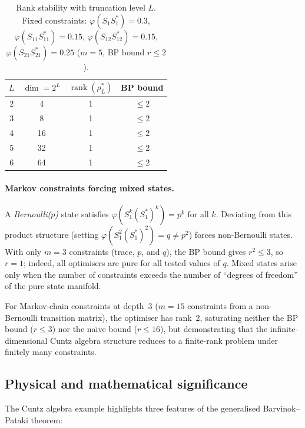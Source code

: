 \documentclass[11pt,a4paper]{article}
\theoremstyle{definition}
\newcommand{\rank}{\operatorname{rank}}
\begin{document}
\begin{table}[htbp]
\centering
\caption{Rank stability with truncation level $L$.  Fixed constraints:
$\varphi(S_1 S_1^*) = 0.3$, $\varphi(S_{11} S_{11}^*) = 0.15$,
$\varphi(S_{12} S_{12}^*) = 0.15$, $\varphi(S_{21} S_{21}^*) = 0.25$
($m = 5$, BP bound $r \leq 2$).}
\label{tab:cuntz-conv}
\begin{tabular}{cccc}
\toprule
$L$ & $\dim = 2^L$ & $\rank(\rho^*_L)$ & BP bound \\
\midrule
2 &  4 & 1 & $\leq 2$ \\
3 &  8 & 1 & $\leq 2$ \\
4 & 16 & 1 & $\leq 2$ \\
5 & 32 & 1 & $\leq 2$ \\
6 & 64 & 1 & $\leq 2$ \\
\bottomrule
\end{tabular}
\end{table}

\paragraph{Markov constraints forcing mixed states.}

A \emph{Bernoulli($p$)} state satisfies
$\varphi(S_1^k (S_1^*)^k) = p^k$ for all $k$.  Deviating from
this product structure (setting
$\varphi(S_1^2(S_1^*)^2) = q \neq p^2$) forces non-Bernoulli
states.  With only $m = 3$ constraints (trace, $p$, and $q$),
the BP bound gives $r^2 \leq 3$, so $r = 1$; indeed, all
optimisers are pure for all tested values of $q$.  Mixed states
arise only when the number of constraints exceeds the number of
``degrees of freedom'' of the pure state manifold.

For Markov-chain constraints at depth~3 ($m = 15$ constraints
from a non-Bernoulli transition matrix), the optimiser has
rank~2, saturating neither the BP bound ($r \leq 3$) nor the
na\"{\i}ve bound ($r \leq 16$), but demonstrating that the
infinite-dimensional Cuntz algebra structure reduces to a
finite-rank problem under finitely many constraints.

\subsection{Physical and mathematical significance}

The Cuntz algebra example highlights three features of the
generalised Barvinok--Pataki theorem:
\end{document}
